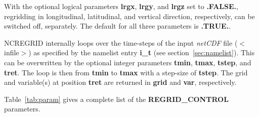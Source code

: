 \documentclass[12pt, a4paper]{article}
\begin{document}
With the optional logical parameters {\bf lrgx}, {\bf lrgy}, and {\bf lrgz}
set to {\bf .FALSE.}, regridding in longitudinal, latitudinal, and
vertical direction, respectively, can be switched off, separately.
The default for all three parameters is {\bf .TRUE.}.

NCREGRID internally loops over the time-steps of the input {\it netCDF} file
($<$infile$>$) as specified by the namelist entry {\bf i\_t}
(see section~\ref{sec:namelist}).
This can be overwritten by the optional integer parameters
{\bf tmin}, {\bf tmax}, {\bf tstep}, and {\bf tret}. The loop is then
from {\bf tmin} to {\bf tmax} with a step-size of {\bf tstep}. The
grid and variable(s) at position {\bf tret} are returned in
{\bf grid} and {\bf var}, respectively.

Table~\ref{tab:param} gives a complete list of the {\bf REGRID\_CONTROL}
parameters.
%
\end{document}
